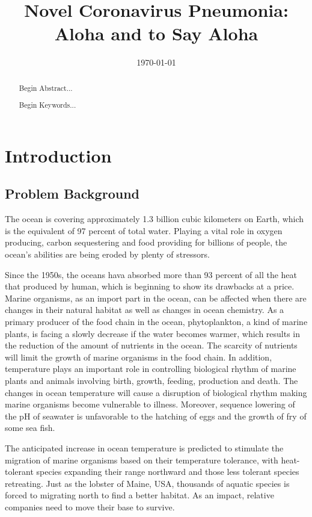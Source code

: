 \documentclass{mcmthesis}
\begin{document}
\linespread{0.6} %
\setlength{\parskip}{0.5\baselineskip} %

\title{Novel Coronavirus Pneumonia: Aloha and to Say Aloha}

\date{\today}
	\begin{abstract}
\hspace{1.2em}
	Begin Abstract...
		\begin{keywords}
			Begin Keywords...
		\end{keywords}
	\end{abstract}


\maketitle

\tableofcontents

\newpage


\section{Introduction}	\label{S1}

\subsection{Problem Background}
	The ocean is covering approximately 1.3 billion cubic kilometers on Earth, which is the equivalent of 97 percent of total water. Playing a vital role in oxygen producing, carbon sequestering and food providing for billions of people, the ocean's abilities are being eroded by plenty of stressors. \par
	Since the 1950s, the oceans hava absorbed more than 93 percent of all the heat that produced by human, which is beginning to show its drawbacks at a price. Marine organisms, as an import part in the ocean, can be affected when there are changes in their natural habitat as well as changes in ocean chemistry. As a primary producer of the food chain in the ocean, phytoplankton, a kind of marine plants, is facing a slowly decrease if the water becomes warmer, which results in the reduction of the amount of nutrients in the ocean. The scarcity of nutrients will limit the growth of marine organisms in the food chain. In addition, temperature plays an important role in controlling biological rhythm of marine plants and animals involving birth, growth, feeding, production and death. The changes in ocean temperature will cause a disruption of biological rhythm making marine organisms become vulnerable to illness. Moreover, sequence lowering of the pH of seawater is unfavorable to the hatching of eggs and the growth of fry of some sea fish.\par
	The anticipated increase in ocean temperature is predicted to stimulate the migration of marine organisms based on their temperature tolerance, with heat-tolerant species expanding their range northward and those less tolerant species retreating. Just as the lobster of Maine, USA, thousands of aquatic species is forced to migrating north to find a better habitat. As an impact, relative companies need to move their base to survive. \par
	
\end{document}
